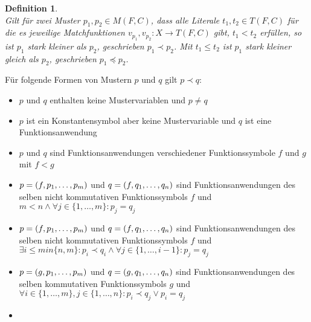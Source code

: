 \newtheorem{defStarkGeordnet}[bsp]{Definition}
\begin{defStarkGeordnet}~\\
Gilt für zwei Muster $p_1, p_2 \in M(F, C)$, dass alle Literale $t_1, t_2 \in T(F, C)$ für die es jeweilige Matchfunktionen $v_{p_1}, v_{p_2} \colon X \rightarrow T(F, C)$ gibt, $t_1 < t_2$ erfüllen, so ist $p_1$ \emph{stark kleiner} als $p_2$, geschrieben $p_1 \prec p_2$. Mit  $t_1 \leq t_2$ ist $p_1$ \emph{stark kleiner gleich} als $p_2$, geschrieben $p_1 \preceq p_2$.
\end{defStarkGeordnet}

Für folgende Formen von Mustern $p$ und $q$ gilt $p \prec q$:
\begin{itemize}
    \item{$p$ und $q$ enthalten keine Mustervariablen und $p \neq q$}
    
    \item{$p$ ist ein Konstantensymbol aber keine Mustervariable und $q$ ist eine Funktionsanwendung}
    
    \item{$p$ und $q$ sind Funktionsanwendungen verschiedener Funktionssymbole $f$ und $g$ mit $f < g$}
    
    \item{$p = (f, {p}_{1}, \dots, {p}_{m})$ und $q = (f, {q}_{1}, \dots, {q}_{n})$ sind Funktionsanwendungen des selben nicht kommutativen Funktionssymbols $f$ und $m < n \land \forall j \in \{1, \dots, m\} \colon p_j = q_j$}
    
    \item{$p = (f, {p}_{1}, \dots, {p}_{m})$ und $q = (f, {q}_{1}, \dots, {q}_{n})$ sind Funktionsanwendungen des selben nicht kommutativen Funktionssymbols $f$ und $\exists i \leq min\{n, m\} \colon p_i \prec q_i \land \forall j \in \{1, \dots, i  - 1\} \colon p_j = q_j$}
    
    \item{$p = (g, {p}_{1}, \dots, {p}_{m})$ und $q = (g, {q}_{1}, \dots, {q}_{n})$ sind Funktionsanwendungen des selben kommutativen Funktionssymbols $g$ und $\forall i \in \{1, \dots, m\}, j \in \{1, \dots, n\} \colon p_i \prec q_j \lor p_i = q_j$}
    
    \item{}
\end{itemize}



